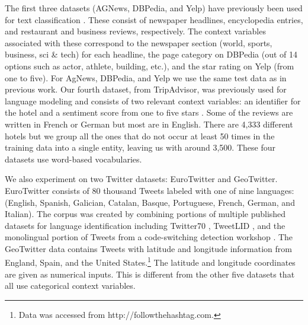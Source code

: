 The first three datasets (AGNews, DBPedia, and Yelp) have previously been used for text classification \cite{zhang2015character}.
These consist of newspaper headlines, encyclopedia entries, and restaurant and business reviews, respectively. The context variables associated with these correspond to the newspaper section (world, sports, business, sci \& tech) for each headline, the page category on DBPedia (out of 14 options such as actor, athlete, building, etc.), and the star rating on Yelp (from one to five).  For AgNews, DBPedia, and Yelp we use the same test data as in previous work. Our fourth dataset, from TripAdvisor, was previously used for language modeling and consists of two relevant context variables: an identifier for the hotel and a sentiment score from one to five stars \cite{TangContextAware}. Some of the reviews are written in French or German but most are in English. There are 4,333 different hotels but we group all the ones that do not occur at least 50 times in the training data into a single entity, leaving us with around 3,500. These four datasets use word-based vocabularies. 

We also experiment on two Twitter datasets: EuroTwitter and GeoTwitter. EuroTwitter consists of 80 thousand Tweets labeled with one of nine languages: (English, Spanish, Galician, Catalan, Basque, Portuguese, French, German, and Italian). The corpus was created by combining portions of multiple published datasets for language identification including Twitter70 \cite{jaech2016hierarchical}, TweetLID \cite{zubiaga2014overview}, and the monolingual portion of Tweets from a code-switching detection workshop \cite{molina2016overview}. The GeoTwitter data contains Tweets with latitude and longitude information from England, Spain, and the United States.\footnote{Data was accessed from http://followthehashtag.com.} The latitude and longitude coordinates are given as numerical inputs. This is different from the other five datasets that all use categorical context variables.
